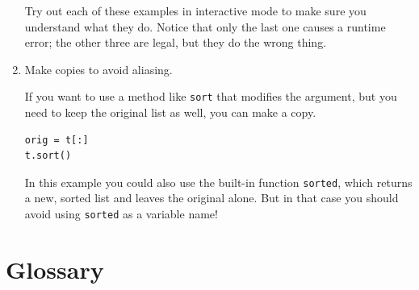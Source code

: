 \documentclass[10pt]{book}
\begin{document}
\begin{enumerate}
Try out each of these examples in interactive mode to make sure
you understand what they do.  Notice that only the last
one causes a runtime error; the other three are legal, but they
do the wrong thing.


\item Make copies to avoid aliasing.

If you want to use a method like {\tt sort} that modifies
the argument, but you need to keep the original list as
well, you can make a copy.

\begin{verbatim}
orig = t[:]
t.sort()
\end{verbatim}

In this example you could also use the built-in function {\tt sorted},
which returns a new, sorted list and leaves the original alone.
But in that case you should avoid using {\tt sorted} as a variable
name!

\end{enumerate}



\section{Glossary}
\end{document}
